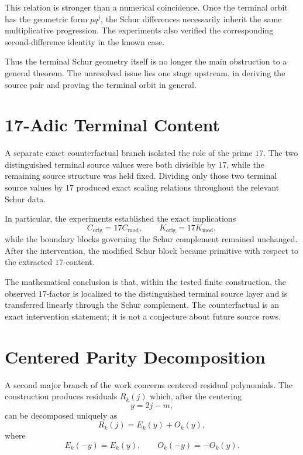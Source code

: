 \documentclass[11pt]{article}
\begin{document}
This relation is stronger than a numerical coincidence. Once the terminal orbit has the geometric form $pq^j$, the Schur differences necessarily inherit the same multiplicative progression. The experiments also verified the corresponding second-difference identity in the known case.

Thus the terminal Schur geometry itself is no longer the main obstruction to a general theorem. The unresolved issue lies one stage upstream, in deriving the source pair and proving the terminal orbit in general.

\section{17-Adic Terminal Content}

A separate exact counterfactual branch isolated the role of the prime $17$. The two distinguished terminal source values were both divisible by $17$, while the remaining source structure was held fixed. Dividing only those two terminal source values by $17$ produced exact scaling relations throughout the relevant Schur data.

In particular, the experiments established the exact implications
\begin{equation}
    C_{\mathrm{orig}}=17C_{\mathrm{mod}},
    \qquad
    K_{\mathrm{orig}}=17K_{\mathrm{mod}},
\end{equation}
while the boundary blocks governing the Schur complement remained unchanged. After the intervention, the modified Schur block became primitive with respect to the extracted $17$-content.

The mathematical conclusion is that, within the tested finite construction, the observed $17$-factor is localized to the distinguished terminal source layer and is transferred linearly through the Schur complement. The counterfactual is an exact intervention statement; it is not a conjecture about future source rows.

\section{Centered Parity Decomposition}

A second major branch of the work concerns centered residual polynomials. The construction produces residuals $R_k(j)$ which, after the centering
\begin{equation}
    y=2j-m,
\end{equation}
can be decomposed uniquely as
\begin{equation}
    R_k(j)=E_k(y)+O_k(y),
\end{equation}
where
\begin{equation}
    E_k(-y)=E_k(y),
    \qquad
    O_k(-y)=-O_k(y).
\end{equation}
\end{document}
